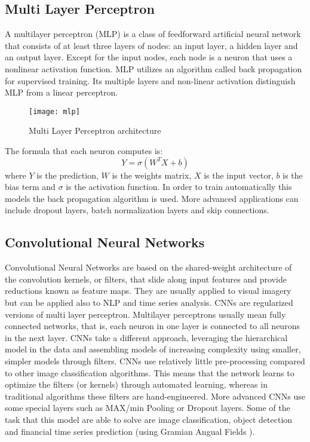 \documentclass[11pt]{article}
\begin{document}
\subsection{Multi Layer Perceptron}
A multilayer perceptron (MLP) is a class of feedforward artificial neural network that consists of at least three layers of nodes: an input layer, a hidden layer and an output layer. Except for the input nodes, each node is a neuron that uses a nonlinear activation function. MLP utilizes an algorithm called back propagation for supervised training. Its multiple layers and non-linear activation distinguish MLP from a linear perceptron. 
\begin{figure}[h]
\centerline{\texttt{[image: mlp]}}
\caption{Multi Layer Perceptron architecture} 
\label{fig}
\end{figure}

\noindent The formula that each neuron computes is:
\begin{displaymath}
Y =\sigma(W^TX+b)
\end{displaymath}
\noindent where $Y$ is the prediction, $W$ is the weights matrix, $X$ is the input vector, $b$ is the bias term and $\sigma$ is the activation function. In order to train automatically this models the back propagation algorithm is used. More advanced applications can include dropout layers, batch normalization layers and skip connections.


\subsection{Convolutional Neural Networks}
Convolutional Neural Networks are based on the shared-weight architecture of the convolution kernels, or filters, that slide along input features and provide reductions known as feature maps. They are usually applied to visual imagery but can be applied also to NLP and time series analysis. CNNs are regularized versions of multi layer perceptron. Multilayer perceptrons usually mean fully connected networks, that is, each neuron in one layer is connected to all neurons in the next layer. CNNs take a different approach, leveraging the hierarchical model in the data and assembling models of increasing complexity using smaller, simpler models through filters. CNNs use relatively little pre-processing compared to other image classification algorithms. This means that the network learns to optimize the filters (or kernels) through automated learning, whereas in traditional algorithms these filters are hand-engineered. More advanced CNNs use some special layers such as MAX/min Pooling or Dropout layers. Some of the task that this model are able to solve are image classification, object detection and financial time series prediction (using Gramian Angual Fields \cite{gaf}).
\end{document}

